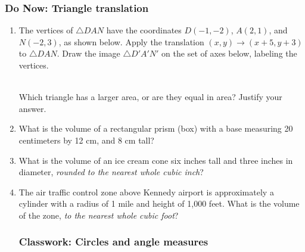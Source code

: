 \documentclass[12pt, twoside]{article}
\begin{document}
\subsubsection*{Do Now: Triangle translation}
 \begin{enumerate}

   \item The vertices of $\triangle DAN$ have the coordinates $D(-1,-2)$, $A(2,1)$, and $N(-2,3)$, as shown below. Apply the translation $(x,y) \rightarrow (x+5, y+3)$ to $\triangle DAN$. Draw the image $\triangle D'A'N'$ on the set of axes below, labeling the vertices.
   \begin{multicols}{2}
     \\[0.5cm]
     Which triangle has a larger area, or are they equal in area? Justify your answer.
   \end{multicols}

     \item What is the volume of a rectangular prism (box) with a base measuring 20 centimeters by 12 cm, and 8 cm tall?  \vspace{2.5cm}

    \item What is the volume of an ice cream cone six inches tall and three inches in diameter, \emph{rounded to the nearest whole cubic inch}?  \vspace{3cm}

    \item The air traffic control zone above Kennedy airport is approximately a cylinder with a radius of 1 mile and height of 1,000 feet. What is the volume of the zone, \emph{to the nearest whole cubic foot}?

\newpage
\subsubsection*{Classwork: Circles and angle measures}


\end{enumerate}
\end{document}

